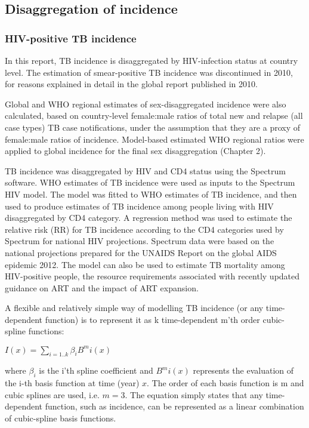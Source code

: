 \subsection{Disaggregation of incidence}
\subsubsection{HIV-positive TB incidence}

In this report, TB incidence is disaggregated by HIV-infection status at country level. The estimation of smear-positive TB incidence was discontinued in 2010, for reasons explained in detail in the global report published in 2010.

Global and WHO regional estimates of sex-disaggregated incidence were also calculated, based on country-level female:male ratios of total new and relapse (all case types) TB case notifications, under the assumption that they are a proxy of female:male ratios of incidence. Model-based estimated WHO regional ratios were applied to global incidence for the final sex disaggregation (Chapter 2).  

TB incidence was disaggregated by HIV and CD4 status using the Spectrum software\cite{Stover2012}. WHO estimates of TB incidence were used as inputs to the Spectrum HIV model. The model was fitted to WHO estimates of TB incidence, and then used to produce estimates of TB incidence among people living with HIV disaggregated by CD4 category. A regression method was used to estimate the relative risk (RR) for TB incidence according to the CD4 categories used by Spectrum for national HIV projections\cite{J2010}. Spectrum data were based on the national projections prepared for the UNAIDS Report on the global AIDS epidemic 2012. The model can also be used to  estimate TB mortality among HIV-positive people, the resource requirements associated with  recently updated guidance on ART and the impact of ART expansion. 

A flexible and relatively simple way of modelling TB incidence (or any time-dependent function) is to represent it as k time-dependent m’th order cubic-spline functions:

$I(x) = \sum_{i=1 .. k} \beta_i B^m i(x)$

where $\beta_i$ is the i'th spline coefficient and $B^m i(x)$ represents the evaluation of the i-th basis function at time (year) $x$. The order of each basis function is m and cubic splines are used, i.e. $m=3$. The equation simply states that any time-dependent function, such as incidence, can be represented as a linear combination of cubic-spline basis functions.

